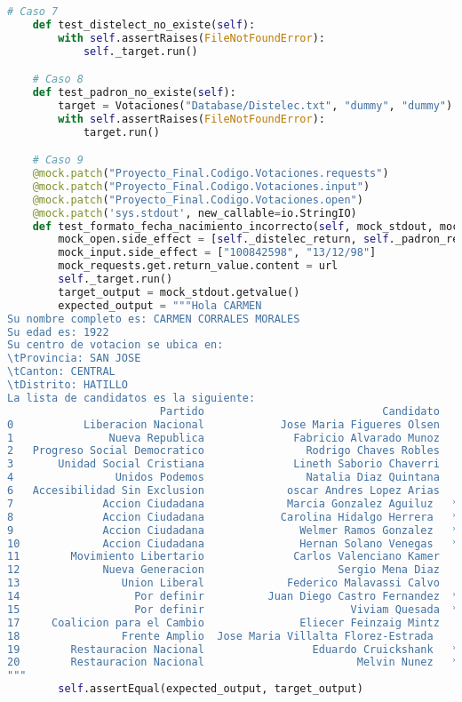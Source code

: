 \documentclass[conference]{IEEEtran}
\begin{document}
\begin{lstlisting}[language=Python, basicstyle=\tiny, breaklines=true,
    postbreak=\mbox{\textcolor{red}{$\hookrightarrow$}\space}]
    # Caso 7
    def test_distelect_no_existe(self):
        with self.assertRaises(FileNotFoundError):
            self._target.run()

    # Caso 8
    def test_padron_no_existe(self):
        target = Votaciones("Database/Distelec.txt", "dummy", "dummy")
        with self.assertRaises(FileNotFoundError):
            target.run()

    # Caso 9
    @mock.patch("Proyecto_Final.Codigo.Votaciones.requests")
    @mock.patch("Proyecto_Final.Codigo.Votaciones.input")
    @mock.patch("Proyecto_Final.Codigo.Votaciones.open")
    @mock.patch('sys.stdout', new_callable=io.StringIO)
    def test_formato_fecha_nacimiento_incorrecto(self, mock_stdout, mock_open, mock_input, mock_requests):
        mock_open.side_effect = [self._distelec_return, self._padron_return]
        mock_input.side_effect = ["100842598", "13/12/98"]
        mock_requests.get.return_value.content = url
        self._target.run()
        target_output = mock_stdout.getvalue()
        expected_output = """Hola CARMEN
Su nombre completo es: CARMEN CORRALES MORALES
Su edad es: 1922
Su centro de votacion se ubica en:
\tProvincia: SAN JOSE
\tCanton: CENTRAL
\tDistrito: HATILLO
La lista de candidatos es la siguiente:
                        Partido                            Candidato    Tipo de candidato
0           Liberacion Nacional            Jose Maria Figueres Olsen    Candidato Oficial
1               Nueva Republica              Fabricio Alvarado Munoz    Candidato Oficial
2   Progreso Social Democratico                Rodrigo Chaves Robles    Candidato Oficial
3       Unidad Social Cristiana              Lineth Saborio Chaverri    Candidato Oficial
4                Unidos Podemos                Natalia Diaz Quintana    Candidato Oficial
6   Accesibilidad Sin Exclusion             oscar Andres Lopez Arias    Candidato Oficial
7              Accion Ciudadana             Marcia Gonzalez Aguiluz   **Posible Candidato
8              Accion Ciudadana            Carolina Hidalgo Herrera   **Posible Candidato
9              Accion Ciudadana               Welmer Ramos Gonzalez   **Posible Candidato
10             Accion Ciudadana               Hernan Solano Venegas   **Posible Candidato
11        Movimiento Libertario              Carlos Valenciano Kamer    Candidato Oficial
12             Nueva Generacion                     Sergio Mena Diaz    Candidato Oficial
13                Union Liberal             Federico Malavassi Calvo    Candidato Oficial
14                  Por definir          Juan Diego Castro Fernandez  **Posible Candidato
15                  Por definir                       Viviam Quesada  **Posible Candidato
17     Coalicion para el Cambio               Eliecer Feinzaig Mintz    Candidato Oficial
18                Frente Amplio  Jose Maria Villalta Florez-Estrada     Candidato Oficial
19        Restauracion Nacional                 Eduardo Cruickshank   **Posible Candidato
20        Restauracion Nacional                        Melvin Nunez   **Posible Candidato
"""
        self.assertEqual(expected_output, target_output)


\end{lstlisting}
\end{document}
